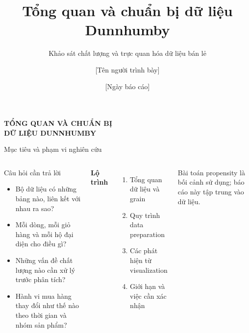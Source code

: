 \documentclass[smaller,aspectratio=169,t]{beamer}
\title{Tổng quan và chuẩn bị dữ liệu Dunnhumby}
\subtitle{Khảo sát chất lượng và trực quan hóa dữ liệu bán lẻ}
\author{[Tên người trình bày]}
\date{[Ngày báo cáo]}
\begin{document}
\begin{frame}[plain]
\vspace{6mm}
{\color{white}\LARGE\bfseries TỔNG QUAN VÀ CHUẨN BỊ\\[2mm]
DỮ LIỆU DUNNHUMBY}\par
{}\par
{}
\end{frame}

\begin{frame}{Mục tiêu và phạm vi nghiên cứu}
\begin{columns}[T,onlytextwidth]
\begin{block}{Câu hỏi cần trả lời}
\begin{itemize}
\item Bộ dữ liệu có những bảng nào, liên kết với nhau ra sao?
\item Mỗi dòng, mỗi giỏ hàng và mỗi hộ đại diện cho điều gì?
\item Những vấn đề chất lượng nào cần xử lý trước phân tích?
\item Hành vi mua hàng thay đổi như thế nào theo thời gian và nhóm sản phẩm?
\end{itemize}
\end{block}
\textbf{Lộ trình}\vspace{3mm}
\begin{enumerate}
\item Tổng quan dữ liệu và grain
\item Quy trình data preparation
\item Các phát hiện từ visualization
\item Giới hạn và việc cần xác nhận
\end{enumerate}
\vspace{4mm}
{\small Bài toán propensity là bối cảnh sử dụng; báo cáo này tập trung vào dữ liệu.}
\end{columns}
\end{frame}
\end{document}
